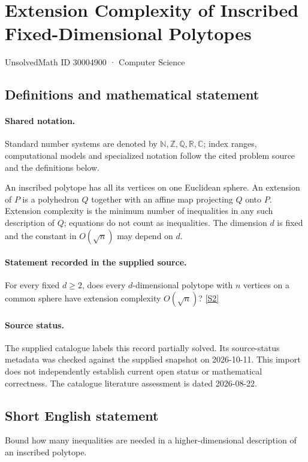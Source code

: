 \documentclass[11pt]{article}
\newcommand{\sref}[2]{\hyperlink{source:#1:#2}{[S#2]}}
\begin{document}
\setcounter{section}{30004899}
\section{Extension Complexity of Inscribed Fixed-Dimensional Polytopes}\label{30004900}
{\small\sffamily UnsolvedMath ID 30004900 · Computer Science}
\subsection{Definitions and mathematical statement}

\paragraph{Shared notation.}Standard number systems are denoted by $\mathbb N,\mathbb Z,\mathbb Q,\mathbb R,\mathbb C$; index ranges, computational models and specialized notation follow the cited problem source and the definitions below.


An inscribed polytope has all its vertices on one Euclidean sphere. An extension of $P$ is a polyhedron $Q$ together with an affine map projecting $Q$ onto $P$. Extension complexity is the minimum number of inequalities in any such description of $Q$; equations do not count as inequalities. The dimension $d$ is fixed and the constant in $O(\sqrt n)$ may depend on $d$.
\paragraph{Statement recorded in the supplied source.}
For every fixed $d\geq2$, does every $d$-dimensional polytope with $n$ vertices on a common sphere have extension complexity $O(\sqrt n)$? \sref{30004900}{2}
\paragraph{Source status.}
The supplied catalogue labels this record partially solved. Its source-status metadata was checked against the supplied snapshot on 2026-10-11. This import does not independently establish current open status or mathematical correctness. The catalogue literature assessment is dated 2026-08-22.
\subsection{Short English statement}
Bound how many inequalities are needed in a higher-dimensional description of an inscribed polytope.
\end{document}
